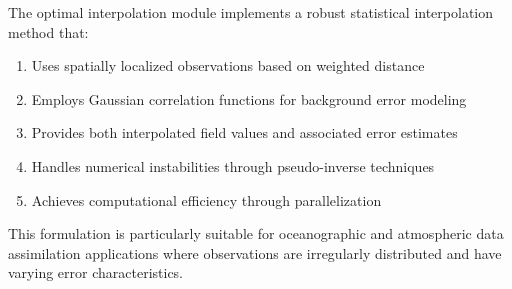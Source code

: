 \documentclass[11pt]{article}
\begin{document}
The optimal interpolation module implements a robust statistical interpolation method that:
\begin{enumerate}
    \item Uses spatially localized observations based on weighted distance
    \item Employs Gaussian correlation functions for background error modeling
    \item Provides both interpolated field values and associated error estimates
    \item Handles numerical instabilities through pseudo-inverse techniques
    \item Achieves computational efficiency through parallelization
\end{enumerate}

This formulation is particularly suitable for oceanographic and atmospheric data assimilation applications where observations are irregularly distributed and have varying error characteristics.
\end{document}
